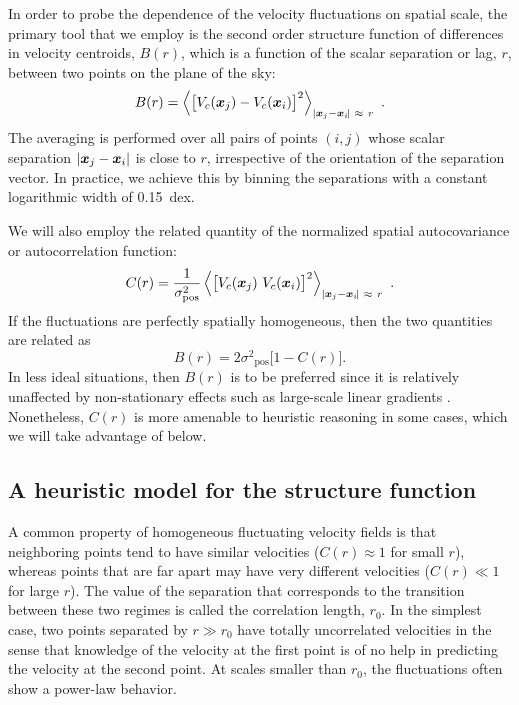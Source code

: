 \documentclass[fleqn,usenatbib, useAMS, a4paper]{mnras}
\newcommand\pos{\ensuremath{_{\mathrm{pos}}}}
\begin{document}
In order to probe the dependence of the velocity fluctuations
on spatial scale,
the primary tool that we employ is
the second order structure function of differences in velocity centroids,
$B(r)$, which is a function of the scalar separation or lag, \(r\),
between two points on the plane of the sky:
%
\newcommand\Abs[1]{\vert #1\vert}
\begin{equation}\label{eq:Br}
  B(r) = \left\langle 
  \bigl[
  V_{c}(\xx_j) - V_{c}(\xx_i)
  \bigr]^{2} \right \rangle_{\Abs{\xx_j - \xx_i\!} \ \approx \ r} \ .
\end{equation}
The averaging is performed over all pairs of points
\((i, j)\)
whose scalar separation \(\Abs{\xx_j - \xx_i}\) is close to \(r\),
irrespective of the orientation of the separation vector.
In practice, we achieve this by binning the separations with a constant
logarithmic width of \SI{0.15}{dex}.

We will also employ the related quantity of the
normalized spatial autocovariance or autocorrelation function:
\begin{equation}
  \label{eq:autocovar}
  C(r) = \frac{1}{\sigma^2\pos}\left\langle 
  \bigl[
  V_{c}(\xx_j) \  V_{c}(\xx_i)
  \bigr]^{2} \right \rangle_{\Abs{\xx_j - \xx_i\!} \ \approx \ r} \ .
\end{equation}
If the fluctuations are perfectly spatially homogeneous, then the
two quantities are related \citep{1984ApJ...277..556S} as
\begin{equation}\label{eq:functional}
  B(r) = 2\sigma^2\pos \bigl[   1 - C(r)\bigr] .
\end{equation}
In less ideal situations, then \(B(r)\) is to be preferred since it is
relatively unaffected by non-stationary effects
such as large-scale linear gradients 
\citep{1984ApJ...277..556S}.
Nonetheless, \(C(r)\) is more amenable to heuristic reasoning in some cases,
which we will take advantage of below.


\subsection{A heuristic model for the structure function}
\label{sec:methods-apply}

A common property of homogeneous fluctuating velocity fields is that neighboring points tend to have similar velocities
(\(C(r) \approx 1\) for small \(r\)),
whereas points that are far apart may have very different velocities
(\(C(r) \ll 1\) for large \(r\)).
The value of the separation that corresponds to
the transition between these two regimes
is called the correlation length, \(r_0\).
In the simplest case,
two points separated by \(r \gg r_0\) have totally uncorrelated velocities
in the sense that knowledge of the velocity at the first point is of
no help in predicting the velocity at the second point.
At scales smaller than \(r_0\), the fluctuations often show a power-law behavior.
\end{document}
